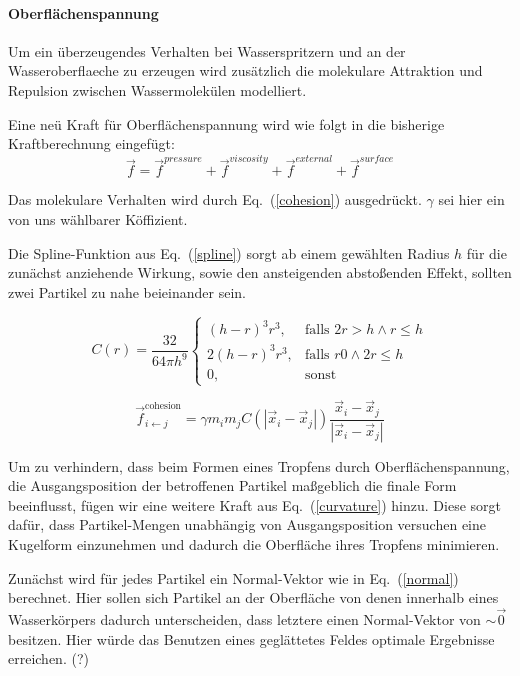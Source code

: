 \documentclass[a4paper]{paper}
\renewcommand{\eqref}[1]{Eq.~(\ref{#1})}
\begin{document}
\paragraph{Oberflächenspannung}
Um ein überzeugendes Verhalten bei Wasserspritzern und an der Wasseroberflaeche zu erzeugen wird zusätzlich die molekulare Attraktion und Repulsion zwischen Wassermolekülen modelliert.

Eine neü Kraft für Oberflächenspannung wird wie folgt in die bisherige Kraftberechnung eingefügt:
\begin{equation}
\label{force_with_surface}
\vec{f} = \vec{f}^{pressure} + \vec{f}^{viscosity} + \vec{f}^{external} + \vec{f}^{surface}
\end{equation}


Das molekulare Verhalten wird durch \eqref{cohesion} ausgedrückt. $\gamma$ sei hier ein von uns wählbarer Köffizient.

Die Spline-Funktion aus \eqref{spline} sorgt ab einem gewählten Radius $h$ für die zunächst anziehende Wirkung, sowie den ansteigenden abstoßenden Effekt, sollten zwei Partikel zu nahe beieinander sein.

\begin{equation}
\label{spline}
C(r) = \frac{32}{64 \pi h^9}
\begin{cases}
(h-r)^3r^3,  &\text{falls }  2r > h \land r \leq h\\
2(h-r)^3r^3, &\text{falls } r  0 \land 2r \leq h\\
0,&\text{sonst}  
\end{cases}
\end{equation}



\begin{equation}
\label{cohesion}
\vec{f}_{i\leftarrow j}^{\text{cohesion}} = \gamma m_{i} m_{j} C(|\vec{x}_i - \vec{x}_j|)\frac{\vec{x}_i - \vec{x}_j}{|\vec{x}_i - \vec{x}_j|}
\end{equation}


Um zu verhindern, dass beim Formen eines Tropfens durch Oberflächenspannung, die Ausgangsposition der betroffenen Partikel maßgeblich die finale Form beeinflusst, fügen wir eine weitere Kraft aus \eqref{curvature} hinzu.
Diese sorgt dafür, dass Partikel-Mengen unabhängig von Ausgangsposition versuchen eine Kugelform einzunehmen und dadurch die Oberfläche ihres Tropfens minimieren.

Zunächst wird für jedes Partikel ein Normal-Vektor wie in \eqref{normal} berechnet. Hier sollen sich Partikel an der Oberfläche von denen innerhalb eines Wasserkörpers dadurch unterscheiden, dass letztere einen Normal-Vektor von $\sim \vec{0}$ besitzen. Hier würde das Benutzen eines geglättetes Feldes optimale Ergebnisse erreichen. (?)
\end{document}

